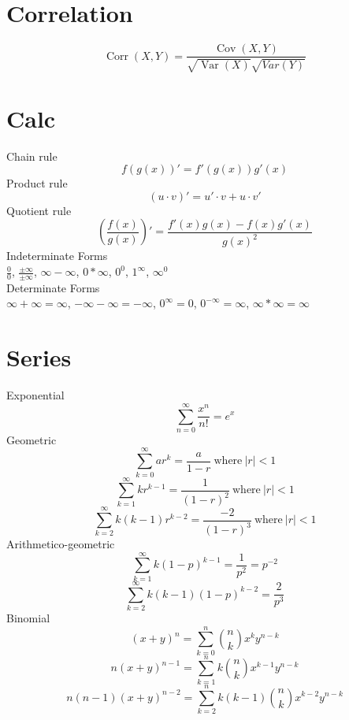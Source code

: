 \documentclass[twocolumn]{amsart}
\newcommand{\Cov}{\operatorname{Cov}}
\newcommand{\Corr}{\operatorname{Corr}}
\newcommand{\Var}{\operatorname{Var}}
\begin{document}
\section*{Correlation}
\begin{equation*}
  \Corr(X, Y) = \frac{\Cov(X, Y)}{\sqrt{\Var(X)}\sqrt{Var(Y)}}
\end{equation*}


\section*{Calc}
Chain rule
\begin{equation*}
  f(g(x))' = f'(g(x))g'(x)
\end{equation*}
Product rule
\begin{equation*}
  (u \cdot v)' = u' \cdot v + u \cdot v'
\end{equation*}
Quotient rule
\begin{equation*}
  \left(\frac{f(x)}{g(x)}\right)' = \frac{f'(x)g(x) - f(x)g'(x)}{g(x)^2}
\end{equation*}
Indeterminate Forms \\
$\frac{0}{0}$, $\frac{\pm\infty}{\pm\infty}$, $\infty-\infty$, $0*\infty$,
$0^{0}$, $1^{\infty}$, $\infty^{0}$ \\
Determinate Forms \\
$\infty+\infty=\infty$, $-\infty-\infty=-\infty$, $0^{\infty}=0$,
$0^{-\infty}=\infty$, $\infty*\infty=\infty$

\section*{Series}
Exponential
\begin{equation*}
  \sum_{n=0}^{\infty}\frac{x^{n}}{n!} = e^{x}
\end{equation*}
Geometric
\begin{equation*}
  \sum_{k=0}^{\infty}{ar^{k}}=\frac{a}{1-r}~\text{where}~|r|<1
\end{equation*}
\begin{equation*}
  \sum_{k=1}^{\infty}{kr^{k-1}}=\frac{1}{(1-r)^{2}}~\text{where}~|r|<1
\end{equation*}
\begin{equation*}
  \sum_{k=2}^{\infty}{k(k-1)r^{k-2}}=\frac{-2}{(1-r)^{3}}~\text{where}~|r|<1
\end{equation*}
Arithmetico-geometric
\begin{equation*}
  \sum_{k=1}^{\infty}k(1-p)^{k-1}=\frac{1}{p^{2}}=p^{-2}
\end{equation*}
\begin{equation*}
  \sum_{k=2}^{\infty}k(k-1)(1-p)^{k-2}=\frac{2}{p^{3}}
\end{equation*}
Binomial
\begin{equation*}
  (x+y)^{n} = \sum_{k=0}^{n}\binom{n}{k}x^{k}y^{n-k}
\end{equation*}
\begin{equation*}
  n(x+y)^{n-1} = \sum_{k=1}^{n}k\binom{n}{k}x^{k-1}y^{n-k}
\end{equation*}
\begin{equation*}
  n(n-1)(x+y)^{n-2} = \sum_{k=2}^{n}k(k-1)\binom{n}{k}x^{k-2}y^{n-k}
\end{equation*}
\end{document}
